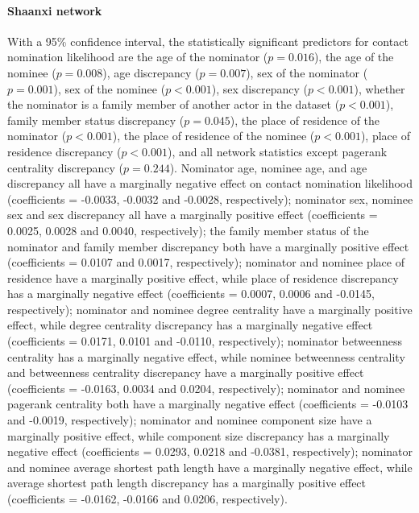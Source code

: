 \paragraph{Shaanxi network} With a 95\% confidence interval, the statistically significant predictors for contact nomination likelihood are the age of the nominator ($p=0.016$), the age of the nominee ($p=0.008$), age discrepancy ($p=0.007$), sex of the nominator ($p=0.001$), sex of the nominee ($p<0.001$), sex discrepancy ($p<0.001$), whether the nominator is a family member of another actor in the dataset ($p<0.001$), family member status discrepancy ($p=0.045$), the place of residence of the nominator ($p<0.001$), the place of residence of the nominee ($p<0.001$), place of residence discrepancy ($p<0.001$), and all network statistics except pagerank centrality discrepancy ($p=0.244$). Nominator age, nominee age, and age discrepancy all have a marginally negative effect on contact nomination likelihood (coefficients = -0.0033, -0.0032 and -0.0028, respectively); nominator sex, nominee sex and sex discrepancy all have a marginally positive effect (coefficients = 0.0025, 0.0028 and 0.0040, respectively); the family member status of the nominator and family member discrepancy both have a marginally positive effect (coefficients = 0.0107 and 0.0017, respectively); nominator and nominee place of residence have a marginally positive effect, while place of residence discrepancy has a marginally negative effect (coefficients = 0.0007, 0.0006 and -0.0145, respectively); nominator and nominee degree centrality have a marginally positive effect, while degree centrality discrepancy has a marginally negative effect (coefficients = 0.0171, 0.0101 and -0.0110, respectively); nominator betweenness centrality has a marginally negative effect, while nominee betweenness centrality and betweenness centrality discrepancy have a marginally positive effect (coefficients = -0.0163, 0.0034 and 0.0204, respectively); nominator and nominee pagerank centrality both have a marginally negative effect (coefficients = -0.0103 and -0.0019, respectively); nominator and nominee component size have a marginally positive effect, while component size discrepancy has a marginally negative effect (coefficients = 0.0293, 0.0218 and -0.0381, respectively); nominator and nominee average shortest path length have a marginally negative effect, while average shortest path length discrepancy has a marginally positive effect (coefficients = -0.0162, -0.0166 and 0.0206, respectively).

